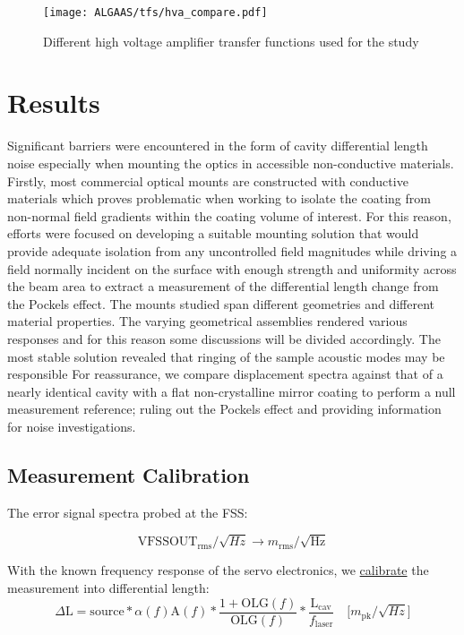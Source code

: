 \begin{figure}[H]
    \texttt{[image: ALGAAS/tfs/hva\_compare.pdf]}
    \caption{Different high voltage amplifier transfer functions used for the study}
    \label{fig:hva_compare}
\end{figure}

\section{Results}
Significant barriers were encountered in the form of cavity differential length noise especially when mounting the optics in accessible non-conductive materials. Firstly, most commercial optical mounts are constructed with conductive materials which proves problematic when working to isolate the coating from non-normal field gradients within the coating volume of interest. For this reason, efforts were focused on developing a suitable mounting solution that would provide adequate isolation from any uncontrolled field magnitudes while driving a field normally incident on the surface with enough strength and uniformity across the beam area to extract a measurement of the differential length change from the Pockels effect. The mounts studied span different geometries and different material properties. The varying geometrical assemblies rendered various responses and for this reason some discussions will be divided accordingly. The most stable solution revealed that ringing of the sample acoustic modes may be responsible For reassurance, we compare displacement spectra against that of a nearly identical cavity with a flat non-crystalline mirror coating to perform a null measurement reference; ruling out the Pockels effect and providing information for noise investigations.

\subsection{Measurement Calibration}
The error signal spectra probed at the FSS:

\begin{equation}
\mathrm{VFSSOUT}_\mathrm{rms}/\sqrt{Hz} \rightarrow m_\mathrm{rms}/\sqrt{\mathrm{Hz}}
\end{equation}

With the known frequency response of the servo electronics, we \hyperref[sec:calibration]{calibrate} the measurement into differential length:
\begin{equation}
	\Delta \mathrm{L} = \mathrm{source}*\alpha(f) \mathrm{A}(f)*\frac{1+\mathrm{OLG}(f)}{\mathrm{OLG}(f)}*\frac{\mathrm{L_{cav}}}{f_\mathrm{laser}} \quad \big[ m_\mathrm{pk} / \sqrt{Hz} \big]
\end{equation}

